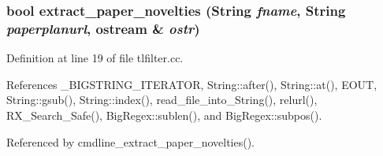\subsubsection{\setlength{\rightskip}{0pt plus 5cm}bool extract\_\-paper\_\-novelties ({\bf String} {\em fname}, {\bf String} {\em paperplanurl}, ostream \& {\em ostr})}\label{dil2al_8hh_a345}




Definition at line 19 of file tlfilter.cc.

References \_\-BIGSTRING\_\-ITERATOR, String::after(), String::at(), EOUT, String::gsub(), String::index(), read\_\-file\_\-into\_\-String(), relurl(), RX\_\-Search\_\-Safe(), Big\-Regex::sublen(), and Big\-Regex::subpos().

Referenced by cmdline\_\-extract\_\-paper\_\-novelties().



